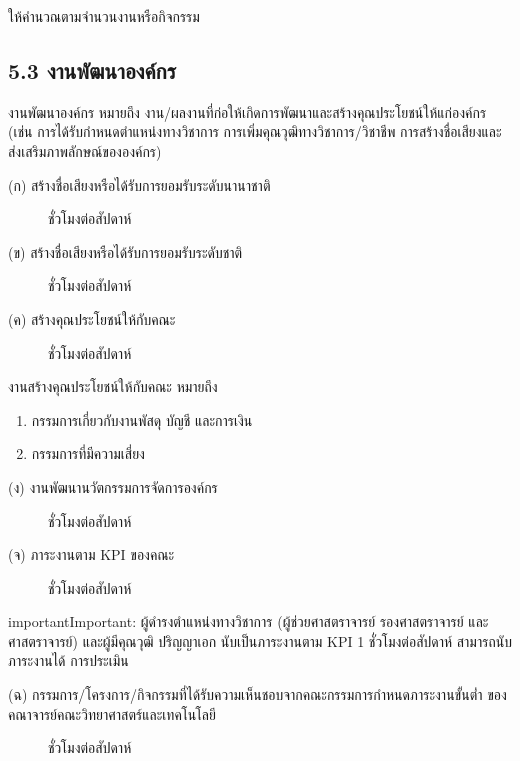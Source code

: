 \documentclass[a4paper,12pt,english]{sphinxmanual}
\begin{document}
ให้คำนวณตามจำนวนงานหรือกิจกรรม


\subsection{5.3 งานพัฒนาองค์กร}
\label{\detokenize{workload_rubric:id95}}
งานพัฒนาองค์กร หมายถึง งาน/ผลงานที่ก่อให้เกิดการพัฒนาและสร้างคุณประโยชน์ให้แก่องค์กร (เช่น การได้รับกำหนดตำแหน่งทางวิชาการ การเพิ่มคุณวุฒิทางวิชาการ/วิชาชีพ การสร้างชื่อเสียงและส่งเสริมภาพลักษณ์ขององค์กร)
\begin{description}
\item[{(ก) สร้างชื่อเสียงหรือได้รับการยอมรับระดับนานาชาติ}]  ชั่วโมงต่อสัปดาห์

\item[{(ข) สร้างชื่อเสียงหรือได้รับการยอมรับระดับชาติ}]  ชั่วโมงต่อสัปดาห์

\item[{(ค) สร้างคุณประโยชน์ให้กับคณะ}]  ชั่วโมงต่อสัปดาห์

\end{description}

งานสร้างคุณประโยชน์ให้กับคณะ หมายถึง
\begin{enumerate}
%
\item {} 
กรรมการเกี่ยวกับงานพัสดุ บัญชี และการเงิน

\item {} 
กรรมการที่มีความเสี่ยง

\end{enumerate}
\begin{description}
\item[{(ง) งานพัฒนานวัตกรรมการจัดการองค์กร}]  ชั่วโมงต่อสัปดาห์

\item[{(จ) ภาระงานตาม KPI ของคณะ}]  ชั่วโมงต่อสัปดาห์

\end{description}

\begin{sphinxadmonition}{important}{Important:}
ผู้ดำรงตำแหน่งทางวิชาการ (ผู้ช่วยศาสตราจารย์ รองศาสตราจารย์ และศาสตราจารย์) และผู้มีคุณวุฒิ ปริญญาเอก นับเป็นภาระงานตาม KPI 1 ชั่วโมงต่อสัปดาห์ สามารถนับภาระงานได้  การประเมิน
\end{sphinxadmonition}
\begin{description}
\item[{(ฉ) กรรมการ/โครงการ/กิจกรรมที่ได้รับความเห็นชอบจากคณะกรรมการกำหนดภาระงานขั้นต่ำ ของคณาจารย์คณะวิทยาศาสตร์และเทคโนโลยี}]  ชั่วโมงต่อสัปดาห์

\end{description}
\end{document}
